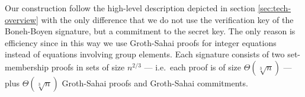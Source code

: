 

%
%
%


%
Our construction follow the high-level description depicted in section \ref{sec:tech-overview} with the only difference that we do not use the verification key of the Boneh-Boyen signature, but a commitment to the secret key. The only reason is efficiency since in this way we use Groth-Sahai proofs for integer equations instead of equations involving group elements. 
Each signature consists of two set-membership proofs in sets of size $n^{2/3}$ --- i.e.~each proof is of size $\Theta(\sqrt[3]{n})$ ---  plus $\Theta(\sqrt[3]{n})$ Groth-Sahai proofs and Groth-Sahai commitments.

